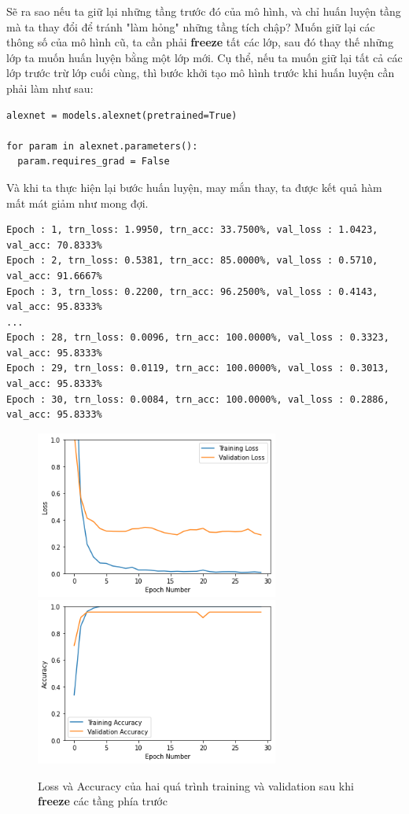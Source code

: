 \documentclass[a4paper]{article}
\begin{document}
Sẽ ra sao nếu ta giữ lại những tầng trước đó của mô hình, và chỉ huấn luyện tầng mà ta thay đổi để tránh "làm hỏng" những tầng tích chập? Muốn giữ lại các thông số của mô hình cũ, ta cần phải \textbf{freeze} tất các lớp, sau đó thay thế những lớp ta muốn huấn luyện bằng một lớp mới. Cụ thể, nếu ta muốn giữ lại tất cả các lớp trước trừ lớp cuối cùng, thì bước khởi tạo mô hình trước khi huấn luyện cần phải làm như sau:
\begin{lstlisting}
alexnet = models.alexnet(pretrained=True)

for param in alexnet.parameters():
  param.requires_grad = False
\end{lstlisting}
Và khi ta thực hiện lại bước huấn luyện, may mắn thay, ta được kết quả hàm mất mát giảm như mong đợi.
\begin{verbatim}
Epoch : 1, trn_loss: 1.9950, trn_acc: 33.7500%, val_loss : 1.0423, val_acc: 70.8333%
Epoch : 2, trn_loss: 0.5381, trn_acc: 85.0000%, val_loss : 0.5710, val_acc: 91.6667%
Epoch : 3, trn_loss: 0.2200, trn_acc: 96.2500%, val_loss : 0.4143, val_acc: 95.8333%
...
Epoch : 28, trn_loss: 0.0096, trn_acc: 100.0000%, val_loss : 0.3323, val_acc: 95.8333%
Epoch : 29, trn_loss: 0.0119, trn_acc: 100.0000%, val_loss : 0.3013, val_acc: 95.8333%
Epoch : 30, trn_loss: 0.0084, trn_acc: 100.0000%, val_loss : 0.2886, val_acc: 95.8333%
\end{verbatim}

\begin{figure}[h!]
\centering
{{\includegraphics[width=8cm]{images/loss1.png} }}
\qquad
{{\includegraphics[width=8cm]{images/acc1.png} }}
\caption*{Loss và Accuracy của hai quá trình training và validation sau khi \textbf{freeze} các tầng phía trước}
\end{figure}
\end{document}
